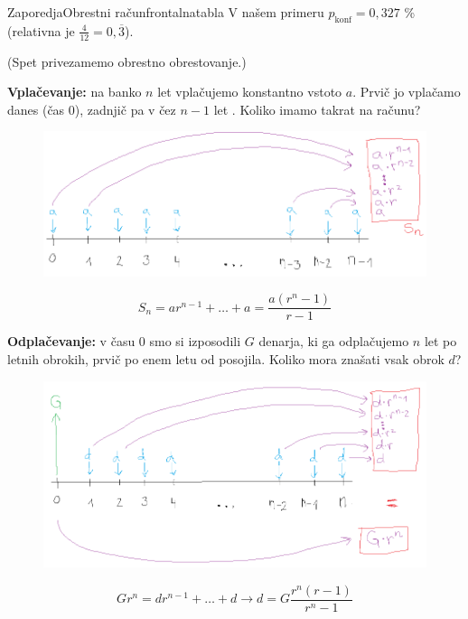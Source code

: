 \begin{priprava}{}{}{Zaporedja}{Obrestni račun}{frontalna}{tabla}
V našem primeru $ p_\text{konf} = 0,327 $ \% (relativna je $ \frac{4}{12} = 0,\overline{3}$).

\newpage


(Spet privezamemo obrestno obrestovanje.)

\textbf{Vplačevanje:} na banko $ n $ let vplačujemo konstantno vstoto $ a $. Prvič jo vplačamo danes (čas 0), zadnjič pa v čez $ n - 1 $ let . Koliko imamo takrat na računu? 

\begin{figure}[h]
    \centering
    \includegraphics[width=\textwidth]{slike/vplačevanje.png}
\end{figure}

$$ S_n = ar^{n-1} + \ldots + a = \frac{a(r^n - 1)}{r - 1} $$

\textbf{Odplačevanje:} v času 0 smo si izposodili $ G $ denarja, ki ga odplačujemo $ n $ let po letnih obrokih, prvič po enem letu od posojila. Koliko mora znašati vsak obrok $ d $? 

\begin{figure}[h]
    \centering
    \includegraphics[width=\textwidth]{slike/odplačevanje.png}
\end{figure}

$$ G r^n =  dr^{n-1} + \ldots + d \rightarrow d = G\frac{r^n(r - 1)}{r^n - 1} $$


\end{priprava}